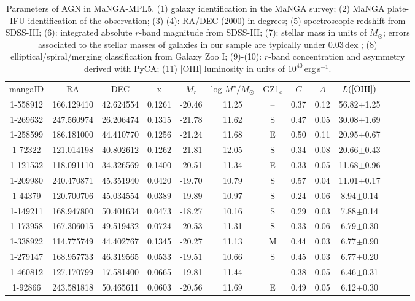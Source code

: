 \begin{table*}
\caption{Parameters of AGN in MaNGA-MPL5. (1) galaxy identification in the MaNGA survey; (2) MaNGA plate-IFU identification of the observation; (3)-(4): RA/DEC (2000) in degrees; (5) spectroscopic redshift from SDSS-III; (6): integrated
absolute $r$-band magnitude from SDSS-III; (7): stellar mass in units of $M_\odot$; errors associated to the stellar masses of galaxies in our sample are typically under 0.03\,dex \citep{Conroy+09}; (8) elliptical/spiral/merging classification from Galaxy Zoo I; (9)-(10): $r$-band concentration and asymmetry derived with PyCA; (11) [OIII] luminosity in units of $10^{40}$\,erg\,s$^{-1}$.}
\begin{tabular}{ccccccccccccc}
mangaID & RA & DEC & x & $M_r$ & log $M^\star/M_\odot$ & GZ1$_c$ & $C$ & $A$ & $L(\rm{[OIII]})$ \\
1-558912 & 166.129410 & 42.624554 & 0.1261 & -20.46 & 11.25 & -- & 0.37 & 0.12 & 56.82$\pm$1.25\\
1-269632 & 247.560974 & 26.206474 & 0.1315 & -21.78 & 11.62 & S & 0.47 & 0.05 & 30.08$\pm$1.69\\
1-258599 & 186.181000 & 44.410770 & 0.1256 & -21.24 & 11.68 & E & 0.50 & 0.11 & 20.95$\pm$0.67\\
1-72322 & 121.014198 & 40.802612 & 0.1262 & -21.81 & 12.05 & S & 0.34 & 0.08 & 20.66$\pm$0.43\\
1-121532 & 118.091110 & 34.326569 & 0.1400 & -20.51 & 11.34 & E & 0.33 & 0.05 & 11.68$\pm$0.96\\
1-209980 & 240.470871 & 45.351940 & 0.0420 & -19.70 & 10.79 & S & 0.57 & 0.04 & 11.01$\pm$0.17\\
1-44379 & 120.700706 & 45.034554 & 0.0389 & -19.89 & 10.97 & S & 0.24 & 0.06 & 8.94$\pm$0.14\\
1-149211 & 168.947800 & 50.401634 & 0.0473 & -18.27 & 10.16 & S & 0.29 & 0.03 & 7.88$\pm$0.14\\
1-173958 & 167.306015 & 49.519432 & 0.0724 & -20.53 & 11.31 & S & 0.33 & 0.06 & 6.79$\pm$0.30\\
1-338922 & 114.775749 & 44.402767 & 0.1345 & -20.27 & 11.13 & M & 0.44 & 0.03 & 6.77$\pm$0.90\\
1-279147 & 168.957733 & 46.319565 & 0.0533 & -19.51 & 10.66 & S & 0.45 & 0.03 & 6.77$\pm$0.20\\
1-460812 & 127.170799 & 17.581400 & 0.0665 & -19.81 & 11.44 & -- & 0.38 & 0.05 & 6.46$\pm$0.31\\
1-92866 & 243.581818 & 50.465611 & 0.0603 & -20.56 & 11.69 & E & 0.49 & 0.05 & 6.12$\pm$0.30\\

\end{tabular}
\end{table*}

